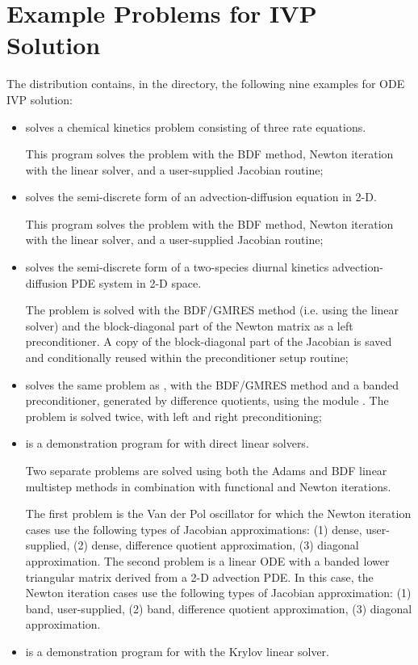 \section{Example Problems for IVP Solution}\label{s:sim_examples}

The {\cvodes} distribution contains, in the 
directory, the following nine examples for ODE IVP solution:

\begin{itemize}
\item {}
  solves a chemical kinetics problem consisting of three rate equations.
  
  This program solves the problem with the BDF method, Newton          
  iteration with the {\cvdense} linear solver, and a user-supplied    
  Jacobian routine;
\item {}
  solves the semi-discrete form of an advection-diffusion equation in 2-D. 
  
  This program solves the problem with the BDF method, Newton          
  iteration with the {\cvband} linear solver, and a user-supplied     
  Jacobian routine;
\item {}
  solves the semi-discrete form of a two-species diurnal kinetics
  advection-diffusion PDE system in 2-D space. 

  The problem is solved with the BDF/GMRES method (i.e.    
  using the {\cvspgmr} linear solver) and the block-diagonal part of the  
  Newton matrix as a left preconditioner. A copy of the block-diagonal 
  part of the Jacobian is saved and conditionally reused within the    
  preconditioner setup routine;
\item {}
  solves the same problem as , with the BDF/GMRES method 
  and a banded preconditioner, generated by difference quotients, 
  using the module {\cvbandpre}.
  The problem is solved twice, with left and right preconditioning;
\item {}
  is a demonstration program for {\cvodes} with direct linear solvers.

  Two separate problems are solved using both the Adams and BDF linear
  multistep methods in combination with functional and Newton
  iterations. 

  The first problem is the Van der Pol oscillator for which 
  the Newton iteration cases use the following types of Jacobian approximations:
  (1) dense, user-supplied, (2) dense, difference quotient approximation, 
  (3) diagonal approximation. The second problem is a linear ODE with a
  banded lower triangular matrix derived from a 2-D advection PDE. In this
  case, the Newton iteration cases use the following types of Jacobian
  approximation: (1) band, user-supplied, (2) band, difference       
  quotient approximation, (3) diagonal approximation.
\item {}
  is a demonstration program for {\cvodes} with the Krylov linear solver.


\end{itemize}
